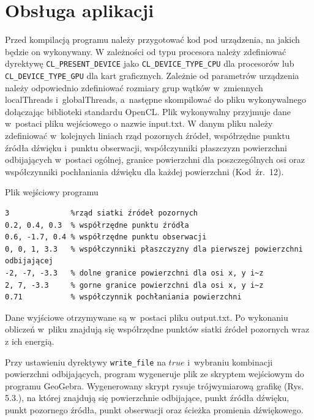 
\section{Obsługa aplikacji}\label{sec:oa}

Przed kompilacją programu należy przygotować kod pod urządzenia, na jakich  będzie on wykonywany. W zależności od typu procesora należy zdefiniować dyrektywę \verb|CL_PRESENT_DEVICE| jako \verb|CL_DEVICE_TYPE_CPU| dla procesorów lub \verb|CL_DEVICE_TYPE_GPU| dla kart graficznych. Zależnie od parametrów urządzenia należy odpowiednio zdefiniować rozmiary grup wątków w~zmiennych localThreads i~globalThreads, a~następne skompilować do pliku wykonywalnego dołączając biblioteki standardu OpenCL. Plik wykonywalny przyjmuje dane w~postaci pliku wejściowego o nazwie input.txt. W danym pliku należy zdefiniować w~kolejnych liniach  rząd pozornych źródeł, współrzędne punktu źródła dźwięku i~punktu obserwacji, współczynniki płaszczyzn powierzchni odbijających w~postaci ogólnej, granice powierzchni dla poszczególnych osi oraz współczynniki pochłaniania dźwięku dla każdej powierzchni (Kod~źr.~12).

\begin{program}[H]
\caption{Plik wejściowy programu}
\begin{lstlisting}
3              %rząd siatki źródeł pozornych
0.2, 0.4, 0.3  % współrzędne punktu źródła
0.6, -1.7, 0.4 % współrzędne punktu obserwacji
0, 0, 1, 3.3   % współczynniki płaszczyzny dla pierwszej powierzchni odbijającej 
-2, -7, -3.3   % dolne granice powierzchni dla osi x, y i~z 
2, 7, -3.3     % gorne granice powierzchni dla osi x, y i~z
0.71           % współczynnik pochłaniania powierzchni
\end{lstlisting}
\end{program}

Dane wyjściowe otrzymywane są w~postaci pliku output.txt. Po wykonaniu obliczeń w~pliku znajdują się współrzędne punktów siatki źródeł pozornych wraz z ich energią.

Przy ustawieniu dyrektywy \verb|write_file| na $true$ i~wybraniu kombinacji powierzchni odbijających, program wygeneruje plik ze skryptem wejściowym do programu GeoGebra. Wygenerowany skrypt rysuje trójwymiarową grafikę (Rys. 5.3.), na której znajdują się powierzchnie odbijające, punkt źródła dźwięku, punkt pozornego źródła, punkt obserwacji oraz ścieżka promienia dźwiękowego.

